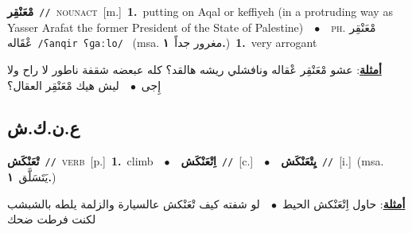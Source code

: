 \documentclass[10pt,a4paper,twoside]{article} %
\begin{document}
\begin{multicols}{2}
{\setlength\topsep{0pt}\textbf{\foreignlanguage{arabic}{مْعَنْقِر}}\ {\color{gray}\texttt{//}\color{black}}\ \textsc{noun\textunderscore act}\ [m.]\ \textbf{1.}~putting on Aqal or keffiyeh (in a protruding way as Yasser Arafat the former President of the State of Palestine)\ \ $\bullet$\ \ \textsc{ph.} \color{gray} \foreignlanguage{arabic}{مْعَنْقِر عْقَاله}\color{black}\ {\color{gray}\texttt{/{\sffamily ʕanqir ʕɡaːlo}/}\color{black}}\ \color{gray} (msa. \foreignlanguage{arabic}{مغرور جداً}~\foreignlanguage{arabic}{\textbf{١.}})\color{black}\ \textbf{1.}~very arrogant\  \begin{flushright}\color{gray}\foreignlanguage{arabic}{\textbf{\underline{\foreignlanguage{arabic}{أمثلة}}}: عشو مْعَنْقِر عْقاله ونافشلي ريشه هالقد؟ كله عبعضه شقفة ناطور لا راح ولا إِجى\ $\bullet$\ \  ليش هيك مْعَنْقِر العقال؟}\end{flushright}\color{black}} \vspace{2mm}

\vspace{-3mm}
\subsection*{\color{blue}\foreignlanguage{arabic}{ع.ن.ك.ش}\color{blue}{}} 

{\setlength\topsep{0pt}\textbf{\foreignlanguage{arabic}{تْعَنْكَش}}\ {\color{gray}\texttt{//}\color{black}}\ \textsc{verb}\ [p.]\ \textbf{1.}~climb\ \ $\bullet$\ \ \setlength\topsep{0pt}\textbf{\foreignlanguage{arabic}{اِتْعَنْكَش}}\ {\color{gray}\texttt{//}\color{black}}\ [c.]\ \ $\bullet$\ \ \setlength\topsep{0pt}\textbf{\foreignlanguage{arabic}{يِتْعَنْكَش}}\ {\color{gray}\texttt{//}\color{black}}\ [i.]\ \color{gray}(msa. \foreignlanguage{arabic}{يَتَسَلَّق}~\foreignlanguage{arabic}{\textbf{١.}})\color{black}\  \begin{flushright}\color{gray}\foreignlanguage{arabic}{\textbf{\underline{\foreignlanguage{arabic}{أمثلة}}}: حاول اِتْعَنْكش الحيط\ $\bullet$\ \  لو شفته كيف تْعَنْكش عالسيارة والزلمة يلطه بالشبشب لكنت فرطت ضحك}\end{flushright}\color{black}} \vspace{2mm}


\end{multicols}
\end{document}
